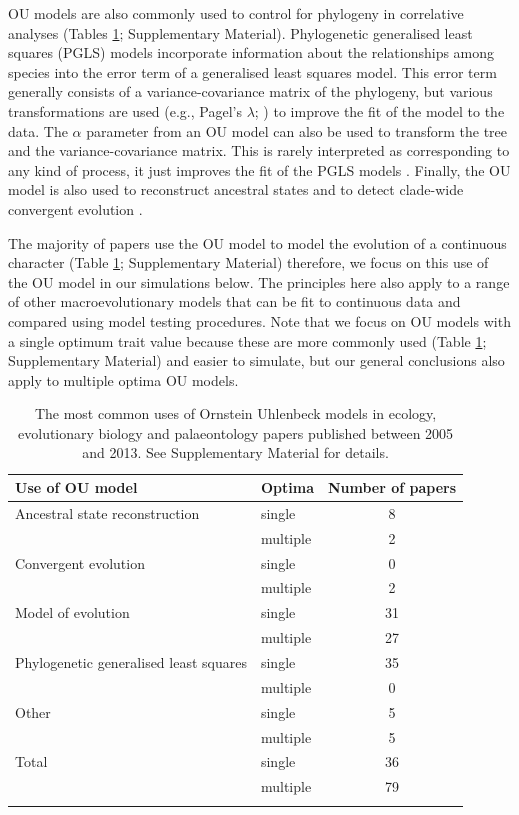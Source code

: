 \documentclass[a4paper,12pt]{article}
\begin{document}
  OU models are also commonly used to control for phylogeny in correlative analyses (Tables \ref{table.uses}; Supplementary Material).  
  Phylogenetic generalised least squares (PGLS) models incorporate information about the relationships among species into the error term of a generalised least squares model. 
  This error term generally consists of a variance-covariance matrix of the phylogeny, but various transformations are used (e.g., Pagel's $\lambda$; \citealp{Pagel:1997aa}) to improve the fit of the model to the data. 
  The $\alpha$ parameter from an OU model can also be used to transform the tree and the variance-covariance matrix.
  This is rarely interpreted as corresponding to any kind of process, it just improves the fit of the PGLS models \citep[e.g.,][]{blankers2012ecological}. Finally, the OU model is also used to reconstruct ancestral states \citep{martins1999estimation} and to detect clade-wide convergent evolution \citep{ingram2013surface}. 

  The majority of papers use the OU model to model the evolution of a continuous character (Table \ref{table.uses}; Supplementary Material) therefore, we focus on this use of the OU model in our simulations below. 
  The principles here also apply to a range of other macroevolutionary models that can be fit to continuous data and compared using model testing procedures.
  Note that we focus on OU models with a single optimum trait value because these are more commonly used (Table \ref{table.uses}; Supplementary Material) and easier to simulate, but our general conclusions also apply to multiple optima OU models.

    \begin{table}[h]
        \caption{The most common uses of Ornstein Uhlenbeck models in ecology, evolutionary biology and palaeontology papers published between 2005 and 2013. See Supplementary Material for details.}
        \bigskip  
          \begin{tabular}{p{8cm}lc}
            \hline
            Use of OU model & Optima & Number of papers\\
            \hline
            Ancestral state reconstruction & single & 8\\
            & multiple & 2\\
            Convergent evolution & single & 0\\
            & multiple & 2\\
            Model of evolution & single & 31\\
            & multiple & 27\\
            Phylogenetic generalised least squares & single & 35\\
            & multiple & 0\\
            Other & single & 5\\
            & multiple & 5\\
            Total & single &  36\\
            & multiple & 79\\
            \hline
            \label{table.uses}
          \end{tabular}
    \end{table}
\end{document}
